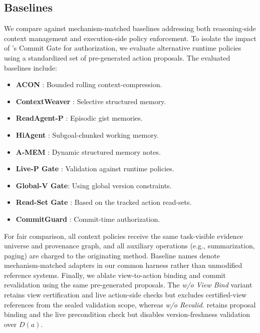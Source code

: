 \subsection{Baselines}
We compare \method{} against mechanism-matched baselines addressing both reasoning-side context management and
execution-side policy enforcement.
To isolate the impact of \method{}'s Commit Gate for authorization,
we evaluate alternative runtime policies using a standardized set of pre-generated action proposals.
The evaluated baselines include:
\begin{itemize}
    \item \textbf{ACON} \cite{acon}: Bounded rolling context-compression.
    \item \textbf{ContextWeaver} \cite{contextweaver}: Selective structured memory.
    \item \textbf{ReadAgent-P} \cite{readagent}: Episodic gist memories.
    \item \textbf{HiAgent} \cite{hiagent}: Subgoal-chunked working memory.
    \item \textbf{A-MEM} \cite{amem}: Dynamic structured memory notes.
    \item \textbf{Live-P Gate} \cite{agentspec}: Validation against runtime policies.
    \item \textbf{Global-V Gate}: Using global version constraints.
    \item \textbf{Read-Set Gate} \cite{sbus}: Based on the tracked action read-sets.
    \item \textbf{CommitGuard} \cite{committimeauth}: Commit-time authorization.
\end{itemize}
For fair comparison, all context policies receive the same task-visible evidence universe and provenance graph,
and all auxiliary operations (e.g., summarization, paging) are charged to the originating method. Baseline names denote mechanism-matched adapters in our common harness rather than unmodified reference systems.
Finally, we ablate view-to-action binding and commit revalidation using the same pre-generated proposals. The \emph{w/o View Bind} variant retains view certification and live action-side checks but excludes certified-view references from the sealed validation scope, whereas \emph{w/o Revalid.} retains proposal binding and the live precondition check but disables version-freshness validation over $D(a)$.
